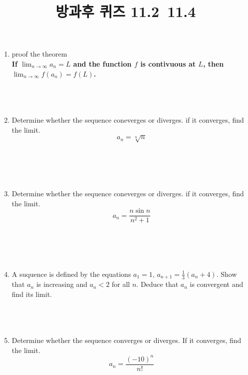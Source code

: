 \documentclass[12pt, a4paper]{article}
\title{방과후 퀴즈 11.2~11.4}
\author{}
\date{}
\begin{document}
\maketitle
\begin{enumerate}
    \item proof the theorem \\ \textbf{If \( \lim_{n\to\infty} a_n = L \) and the function \(f\) is contivuous at \(L\), then \( \lim_{n\to\infty} f(a_n) = f(L) \).} \\ \\ \\ \\

    \item Determine whether the sequence coneverges or diverges. if it converges, find the limit.
    \[ a_n = \sqrt[n]{n} \] \\ \\ \\ \\
    
    \item Determine whether the sequence coneverges or diverges. if it converges, find the limit.
    \[ a_n = \dfrac{n\sin n}{n^2+1} \] \\ \\ \\ \\ 

    \item A suquence is defined by the equations \(a_1=1\), \(a_{n+1}=\frac{1}{3}(a_n+4)\). Show that {\(a_n\)} is increasing and \(a_n<2\) for all \(n\). Deduce that {\(a_n\)} is convergent and find its limit. \\ \\ \\ \\ 
    
    \item Determine whether the sequence converges or diverges. If it converges, find the limit.
    \[ a_n = \frac{(-10)^n}{n!} \] 

\end{enumerate}
\end{document}

